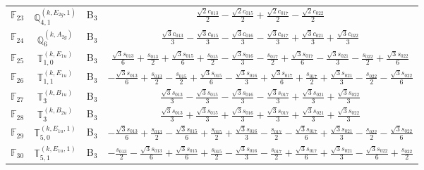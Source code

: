 \documentclass[fleqn,10pt,landscape]{article}
\begin{document}
\begin{itemize}
\begin{center}
\begin{longtable}{c|c|c|c}
$ \mathbb{F}_{23} $ & $\mathbb{Q}_{4,1}^{(k,E_{2g},1)}$ & B$_{3}$ & $\frac{\sqrt{2} c_{013}}{2} - \frac{\sqrt{2} c_{015}}{2} + \frac{\sqrt{2} c_{017}}{2} - \frac{\sqrt{2} c_{022}}{2}$ \\
$ \mathbb{F}_{24} $ & $\mathbb{Q}_{6}^{(k,A_{2g})}$ & B$_{3}$ & $\frac{\sqrt{3} c_{013}}{3} - \frac{\sqrt{3} c_{015}}{3} - \frac{\sqrt{3} c_{016}}{3} - \frac{\sqrt{3} c_{017}}{3} + \frac{\sqrt{3} c_{021}}{3} + \frac{\sqrt{3} c_{022}}{3}$ \\
$ \mathbb{F}_{25} $ & $\mathbb{T}_{1,0}^{(k,E_{1u})}$ & B$_{3}$ & $\frac{\sqrt{3} s_{013}}{6} + \frac{s_{013}}{2} + \frac{\sqrt{3} s_{015}}{6} + \frac{s_{015}}{2} - \frac{\sqrt{3} s_{016}}{3} - \frac{s_{017}}{2} + \frac{\sqrt{3} s_{017}}{6} - \frac{\sqrt{3} s_{021}}{3} - \frac{s_{022}}{2} + \frac{\sqrt{3} s_{022}}{6}$ \\
$ \mathbb{F}_{26} $ & $\mathbb{T}_{1,1}^{(k,E_{1u})}$ & B$_{3}$ & $- \frac{\sqrt{3} s_{013}}{6} + \frac{s_{013}}{2} - \frac{s_{015}}{2} + \frac{\sqrt{3} s_{015}}{6} - \frac{\sqrt{3} s_{016}}{3} + \frac{\sqrt{3} s_{017}}{6} + \frac{s_{017}}{2} + \frac{\sqrt{3} s_{021}}{3} - \frac{s_{022}}{2} - \frac{\sqrt{3} s_{022}}{6}$ \\
$ \mathbb{F}_{27} $ & $\mathbb{T}_{3}^{(k,B_{1u})}$ & B$_{3}$ & $\frac{\sqrt{3} s_{013}}{3} - \frac{\sqrt{3} s_{015}}{3} - \frac{\sqrt{3} s_{016}}{3} - \frac{\sqrt{3} s_{017}}{3} + \frac{\sqrt{3} s_{021}}{3} + \frac{\sqrt{3} s_{022}}{3}$ \\
$ \mathbb{F}_{28} $ & $\mathbb{T}_{3}^{(k,B_{2u})}$ & B$_{3}$ & $\frac{\sqrt{3} s_{013}}{3} + \frac{\sqrt{3} s_{015}}{3} + \frac{\sqrt{3} s_{016}}{3} + \frac{\sqrt{3} s_{017}}{3} + \frac{\sqrt{3} s_{021}}{3} + \frac{\sqrt{3} s_{022}}{3}$ \\
$ \mathbb{F}_{29} $ & $\mathbb{T}_{5,0}^{(k,E_{1u},1)}$ & B$_{3}$ & $- \frac{\sqrt{3} s_{013}}{6} + \frac{s_{013}}{2} - \frac{\sqrt{3} s_{015}}{6} + \frac{s_{015}}{2} + \frac{\sqrt{3} s_{016}}{3} - \frac{s_{017}}{2} - \frac{\sqrt{3} s_{017}}{6} + \frac{\sqrt{3} s_{021}}{3} - \frac{s_{022}}{2} - \frac{\sqrt{3} s_{022}}{6}$ \\
$ \mathbb{F}_{30} $ & $\mathbb{T}_{5,1}^{(k,E_{1u},1)}$ & B$_{3}$ & $- \frac{s_{013}}{2} - \frac{\sqrt{3} s_{013}}{6} + \frac{\sqrt{3} s_{015}}{6} + \frac{s_{015}}{2} - \frac{\sqrt{3} s_{016}}{3} - \frac{s_{017}}{2} + \frac{\sqrt{3} s_{017}}{6} + \frac{\sqrt{3} s_{021}}{3} - \frac{\sqrt{3} s_{022}}{6} + \frac{s_{022}}{2}$ \\
\end{longtable}
\end{center}


\end{itemize}
\end{document}
